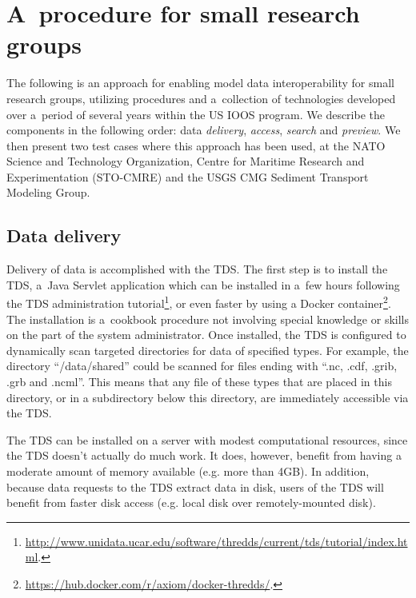 \documentclass[osd, online, hvmath]{copernicus}
\begin{document}
\section{A~procedure for small research groups}

The following is an approach for enabling model data interoperability
for small research groups, utilizing procedures and a~collection of
technologies developed over a~period of several years within the US
IOOS program. We describe the components in the following order: data
\textit{delivery}, \textit{access}, \textit{search} and
\textit{preview}. We then present two test cases where this
approach has been used, at the NATO Science and Technology Organization, Centre for Maritime Research and Experimentation (STO-CMRE) and the USGS CMG Sediment
Transport Modeling Group.

\subsection{Data delivery}

Delivery of data is accomplished with the TDS. The first step is to install the TDS, a~Java Servlet
application which can be installed in a~few hours following the TDS
administration
tutorial\footnote{\url{http://www.unidata.ucar.edu/software/thredds/current/tds/tutorial/index.html}.}, or even faster by using a Docker container\footnote{\url{https://hub.docker.com/r/axiom/docker-thredds/}.}. The
installation is a~cookbook procedure not involving special knowledge
or skills on the part of the system administrator. Once installed, the
TDS is configured to dynamically scan targeted directories for data of
specified types. For example, the directory ``/data/shared'' could be
scanned for files ending with ``.nc, .cdf, .grib, .grb and
.ncml''. This means that any file of these types that are placed in
this directory, or in a subdirectory below this directory, are
immediately accessible via the TDS.

The TDS can be installed on a server with modest computational resources, since the TDS doesn't actually do much work.  It does, however, benefit from having a moderate amount of memory available (e.g. more than 4GB).  In addition, because data requests to the TDS extract data in disk, users of the TDS will benefit from faster disk access (e.g. local disk over remotely-mounted disk). 
\end{document}
